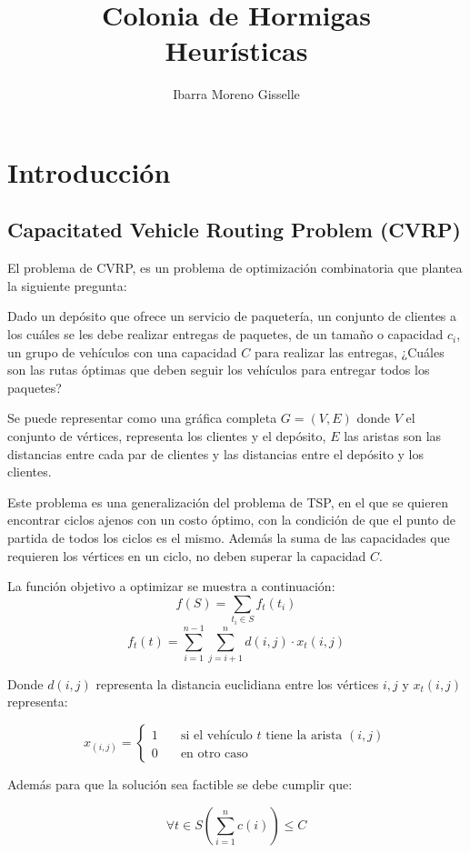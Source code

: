\documentclass[12pt]{article}
\author{Ibarra Moreno Gisselle }
\title{Colonia de Hormigas\\Heurísticas}
\begin{document}
	\maketitle
	
	\section{Introducción}
	\subsection{Capacitated Vehicle Routing Problem (CVRP)}
	
	El problema de CVRP, es un problema de optimización combinatoria que plantea la
	siguiente pregunta:
	
	Dado un depósito que ofrece un servicio de paquetería, un conjunto de clientes a
	los cuáles se les debe realizar entregas de paquetes, de un tamaño o capacidad $c_i$, un grupo de vehículos con una capacidad $C$ para realizar las entregas, 
	¿Cuáles son las rutas óptimas que deben seguir los vehículos para entregar todos
	los paquetes?
	
	Se puede representar como una gráfica completa $G=(V,E)$ donde $V$ el conjunto 
	de vértices, representa los clientes y el depósito, $E$ las aristas son las
	distancias entre cada par de clientes y las distancias entre el depósito y los
	clientes.
	
	Este problema es una generalización del problema de TSP, en el que se quieren
	encontrar ciclos ajenos con un costo óptimo, con la condición de que el punto de
	partida de todos los ciclos es el mismo. Además la suma de las capacidades que
	requieren los vértices en un ciclo, no deben superar la capacidad $C$.
	
	La función objetivo a optimizar se muestra a continuación:
	\[f(S)=\sum_{t_i \in S}f_t(t_i)\]
	\[f_t(t)=\sum_{i=1}^{n-1}\sum_{j=i+1}^{n}d(i,j)\cdot x_t(i,j) \]
	
	Donde $d(i,j)$ representa la distancia euclidiana entre los vértices $i,j$ y 
	$x_t(i,j)$ representa:
	
	\[x_(i,j)=
	\begin{cases}
		1&\quad\text{si el vehículo $t$ tiene la arista $(i,j)$}\\
		0 & \quad\text{en otro caso}
	\end{cases}\]
	
	Además para que la solución sea factible se debe cumplir que:
	
	\[\forall t\in S \left( \sum_{i=1}^{n}c(i) 
	\right) \leq C\] 
	
\end{document}
